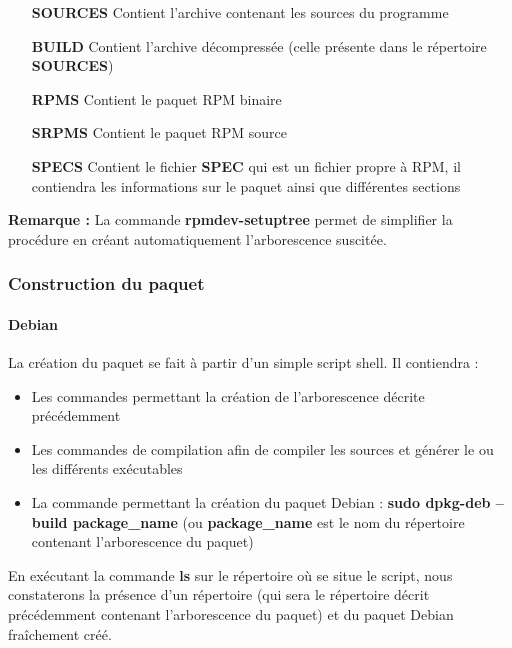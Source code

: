 \documentclass[12pt,a4paper]{article}
\newenvironment{remarque}{\textbf{Remarque :}}{}
\begin{document}
\begin{itemize}
	\item[\textbf{SOURCES}]Contient l'archive contenant les sources du programme
	\item[\textbf{BUILD}]Contient l'archive décompressée (celle présente dans le répertoire \textbf{SOURCES}) 
	\item[\textbf{RPMS}]Contient le paquet RPM binaire
	\item[\textbf{SRPMS}]Contient le paquet RPM source 
	\item[\textbf{SPECS}]Contient le fichier \textbf{SPEC} qui est un fichier propre à RPM, il contiendra les informations sur le paquet ainsi que différentes sections
\end{itemize}
\begin{remarque} La commande \textbf{rpmdev-setuptree} permet de simplifier la procédure en créant automatiquement l'arborescence suscitée.\end{remarque}

\begin{figure}[!h]
	\centering
\end{figure}

\subsubsection{Construction du paquet}
\paragraph{Debian} La création du paquet se fait à partir d'un simple script shell. Il contiendra :
\begin{itemize}
	\item Les commandes permettant la création de l'arborescence décrite précédemment
	\item Les commandes de compilation afin de compiler les sources et générer le ou les différents exécutables
	\item La commande permettant la création du paquet Debian : \textbf{sudo dpkg-deb --build package\_name} (ou \textbf{package\_name} est le nom du répertoire contenant l'arborescence du paquet)
\end{itemize}
En exécutant la commande \textbf{ls} sur le répertoire où se situe le script, nous constaterons la présence d'un répertoire (qui sera le répertoire décrit précédemment contenant l'arborescence du paquet) et du paquet Debian fraîchement créé.
\end{document}
